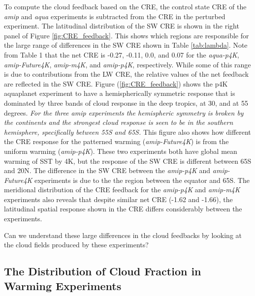 \documentclass[draft]{agujournal2019}
\begin{document}
To compute the cloud feedback based on the CRE, the control state CRE of 
the \textit{amip} and \textit{aqua} experiments is subtracted from the CRE in the perturbed experiment.  
The latitudinal distribution of the SW CRE is shown in the right panel of Figure \ref{fig:CRE_feedback}.  
This shows which regions are responsible for the large range of differences in the SW CRE shown in Table \ref{tab:lambda}.  
Note from Table 1 that the net CRE is -0.27, -0.11, 0.0, and 0.07 for the \textit{aqua-p4K}, 
\textit{amip-Future4K}, \textit{amip-m4K}, and \textit{amip-p4K}, respectively.  
While some of this range is due to contributions from the LW CRE, the relative values of the net feedback are reflected in the SW CRE.  
Figure (\ref{fig:CRE_feedback}) shows the p4K aquaplanet experiment to have a hemispherically symmetric response 
that is dominated by three bands of cloud response in the deep tropics, at 30, and at 55 degrees.   
\textit{For the three \textit{amip} experiments the hemispheric symmetry is broken by the continents and the strongest cloud 
response is seen to be in the southern hemisphere, specifically between 55S and 65S.}
This figure also shows how different the CRE response for the patterned warming 
(\textit{amip-Future4K}) is from the uniform warming (\textit{amip-p4K}).  
These two experiments both have global mean warming of SST by 4K, but 
the response of the SW CRE is different between 65S and 20N.  The difference 
in the SW CRE between the \textit{amip-p4K} and \textit{amip-Future4K} experiments
is due to the the region between the equator and 65S.  
The meridional distribution of the CRE feedback for the \textit{amip-p4K} and
\textit{amip-m4K} experiments also reveals that despite 
similar net CRE (-1.62 and -1.66), the latitudinal spatial response shown in the CRE
differs considerably between the experiments.                                                

Can we understand these large differences in the cloud feedbacks by looking at the cloud 
fields produced by these experiments?  

\subsection{The Distribution of Cloud Fraction in Warming Experiments} 

\end{document}
